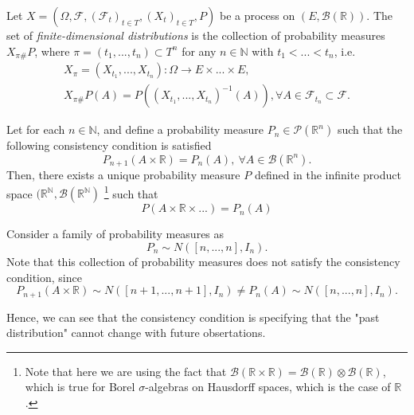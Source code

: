 \begin{definition}
	Let $X = (\Omega, \mathcal F, (\mathcal F_t)_{t \in T}, (X_t)_{t \in T}, P)$
	be a process on $(E,\mathcal B(\mathbb R))$. The set of \textit{finite-dimensional
		distributions} is the collection of probability measures $X_{\pi \#} P$, where
	$\pi = (t_1,...,t_n) \subset T^n$ for any $n \in \mathbb N$ with $t_1<...<t_n$,
	i.e.
	\begin{gather*}
		X_\pi            = (X_{t_1},...,X_{t_n}):\Omega \to E \times ... \times E,                             \\
		X_{\pi \#}P (A)  = P((X_{t_1},...,X_{t_n})^{-1}(A)), \forall A \in \mathcal F_{t_n} \subset \mathcal F.
	\end{gather*}

\end{definition}

\begin{theorem}
	Let for each $n \in \mathbb N$, and define a probability
	measure $P_n \in \mathcal P(\mathbb R^n)$ such that
	the following consistency condition is satisfied
	\begin{equation}
		P_{n+1}(A \times \mathbb R) = P_n(A), \ \forall A \in \mathcal B(\mathbb R^n).
		\label{eq:consistencykolmogorov}
	\end{equation}
	Then, there exists a unique probability measure $P$ defined in the
	infinite product space $(\mathbb R^{\mathbb N},\mathcal B(\mathbb R^\mathbb N)$
	\footnote{Note that here we are using the fact that $\mathcal B(\mathbb R \times \mathbb R)=
			\mathcal B(\mathbb R) \otimes \mathcal B(\mathbb R)$, which is true for Borel $\sigma$-algebras
		on Hausdorff spaces, which is the case of $\mathbb R$.} such that
	\begin{displaymath}
		P(A \times \mathbb R \times ...) =  P_n(A)
	\end{displaymath}

\end{theorem}

\begin{example}
	Consider a family of probability measures
	as
	\begin{displaymath}
		P_n \sim N([n,...,n], I_n).
	\end{displaymath}
	Note that this collection of probability measures does not satisfy
	the consistency condition, since
	\begin{displaymath}
		P_{n+1}(A \times \mathbb R) \sim N([n+1,...,n+1],I_n) \neq
		P_n(A) \sim N([n,...,n], I_n).
	\end{displaymath}

	Hence, we can see that the consistency condition is specifying
	that the "past distribution" cannot change with future obsertations.
\end{example}
